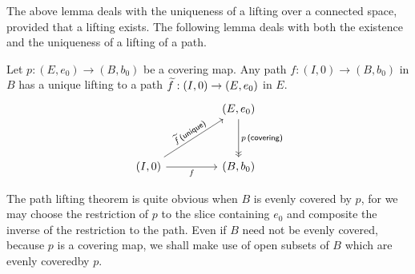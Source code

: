 The above lemma deals with the uniqueness of a lifting over a connected space, provided that a lifting exists.
The following lemma deals with both the existence and the uniqueness of a lifting of a path.
\begin{thm}
    Let $p: (E, e_0)\rightarrow (B, b_0)$ be a covering map.
    Any path $f: (I, 0)\rightarrow (B, b_0)$ in $B$ has a unique lifting to a path $\widetilde{f}: (I, 0)\rightarrow (E, e_0)$ in $E$.
    \begin{equation*}
    \begin{tikzcd}[row sep=1.2cm, column sep=1.6cm]
        &
        (E, e_0)
        \arrow[d, "p\,\textsf{(covering)}", ->>]
        \\
        (I, 0)
        \arrow[ur, "\wt{f}\,\textsf{(unique)}"sloped]
        \arrow[r, "f"']
        &
        (B, b_0)
    \end{tikzcd}
    \end{equation*}
\end{thm}
\begin{rmk}
    The path lifting theorem is quite obvious when $B$ is evenly covered by $p$, for we may choose the restriction of $p$ to the slice containing $e_0$ and composite the inverse of the restriction to the path.
    Even if $B$ need not be evenly covered, because $p$ is a covering map, we shall make use of open subsets of $B$ which are evenly coveredby $p$.
\end{rmk}
